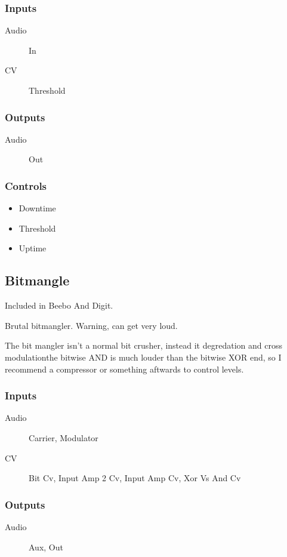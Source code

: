 \subsubsection{Inputs}
\begin{description}
\item [Audio] In
\item [CV] Threshold
\end{description}

\subsubsection{Outputs}
\begin{description}
\item [Audio] Out
\end{description}

\subsubsection{Controls}
\begin{itemize}
\item Downtime
\item Threshold
\item Uptime
\end{itemize}

\subsection{Bitmangle}

Included in Beebo And Digit.

Brutal bitmangler. Warning, can get very loud.

The bit mangler isn't a normal bit crusher, instead it degredation and cross modulationthe bitwise AND is much louder than the bitwise XOR end, so I recommend a compressor or something aftwards to control levels.

\subsubsection{Inputs}
\begin{description}
\item [Audio] Carrier, Modulator
\item [CV] Bit Cv, Input Amp 2 Cv, Input Amp Cv, Xor Vs And Cv
\end{description}

\subsubsection{Outputs}
\begin{description}
\item [Audio] Aux, Out
\end{description}

